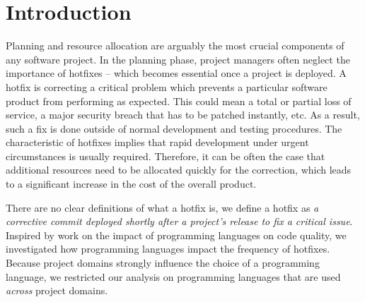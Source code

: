 \documentclass{sig-alternate}
\begin{document}
\section{Introduction}
Planning and resource allocation are arguably the most crucial components of any software project. In the planning phase, project managers often neglect the importance of hotfixes -- which becomes essential once a project is deployed.  A hotfix is correcting a critical problem which prevents a particular software product from performing as expected. This could mean a total or partial loss of service, a major security breach that has to be patched instantly, etc. As a result, such a fix is done outside of normal development and testing procedures. The characteristic of hotfixes implies that rapid development under urgent circumstances is usually required. Therefore, it can be often the case that additional resources need to be allocated quickly for the correction, which leads to a significant increase in the cost of the overall product.


There are no clear definitions of what a hotfix is, we define a hotfix as \emph{a corrective commit deployed shortly after a project's release to fix a critical issue}. Inspired by work on the impact of programming languages on code quality, we investigated how programming languages impact the frequency of hotfixes.  Because project domains strongly influence the choice of a programming language, we restricted our analysis on programming languages that are used \emph{across} project domains.


\end{document}
